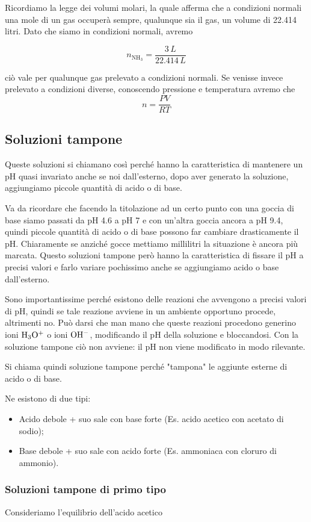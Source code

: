 Ricordiamo la legge dei volumi molari, la quale afferma che a condizioni normali una mole di un gas occuperà sempre, qualunque sia il gas, un volume di 22.414 litri. Dato che siamo in condizioni normali, avremo

$$n_{\text{NH}_3}=\frac{3 \, L}{22.414 \, L}$$

ciò vale per qualunque gas prelevato a condizioni normali. Se venisse invece prelevato a condizioni diverse, conoscendo pressione e temperatura avremo che
$$n=\frac{PV}{RT}$$
\subsection{Soluzioni tampone}
Queste soluzioni si chiamano così perché hanno la caratteristica di mantenere un pH quasi invariato anche se noi dall'esterno, dopo aver generato la soluzione, aggiungiamo piccole quantità di acido o di base.

Va da ricordare che facendo la titolazione ad un certo punto con una goccia di base siamo passati da pH 4.6 a pH 7 e con un'altra goccia ancora a pH 9.4, quindi piccole quantità di acido o di base possono far cambiare drasticamente il pH. Chiaramente se anziché gocce mettiamo millilitri la situazione è ancora più marcata. Questo soluzioni tampone però hanno la caratteristica di fissare il pH a precisi valori e farlo variare pochissimo anche se aggiungiamo acido o base dall'esterno.

Sono importantissime perché esistono delle reazioni che avvengono a precisi valori di pH, quindi se tale reazione avviene in un ambiente opportuno procede, altrimenti no. Può darsi che man mano che queste reazioni procedono generino ioni $\rm H_3O^+$ o ioni $\rm OH^-$, modificando il pH della soluzione e bloccandosi. Con la soluzione tampone ciò non avviene: il pH non viene modificato in modo rilevante.

Si chiama quindi soluzione tampone perché "tampona" le aggiunte esterne di acido o di base.

Ne esistono di due tipi:

\begin{itemize}
    \item Acido debole + suo sale con base forte
    (Es. acido acetico con acetato di sodio);
    \item Base debole + suo sale con acido forte
    (Es. ammoniaca con cloruro di ammonio).
\end{itemize}

\subsubsection{Soluzioni tampone di primo tipo}
Consideriamo l'equilibrio dell'acido acetico

